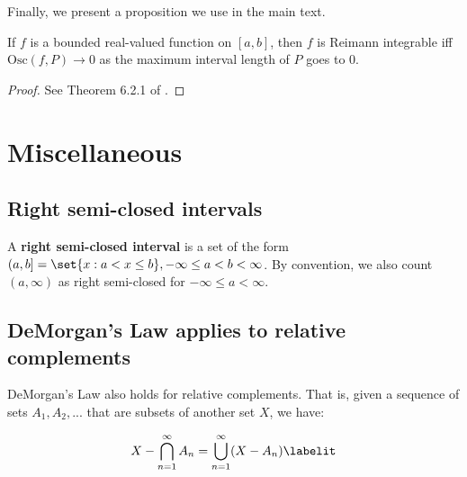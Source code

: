 \documentclass{article} %
\begin{document}
Finally, we present a proposition we use in the main text. 

\begin{proposition}
If $f$ is a bounded real-valued function on $[a,b]$, then $f$ is Reimann integrable iff $\text{Osc}(f,P) \to 0$ as the maximum interval length of $P$ goes to 0.
\label{prop:reimann_integrable_iff_oscillation_goes_to_zero_as_partition_gets_finer}
\end{proposition}

\begin{proof}
See Theorem 6.2.1 of \cite{strichartz2000way}.	
\end{proof}



\section{Miscellaneous}
\subsection{Right semi-closed intervals}
\begin{definition}
A \textbf{right semi-closed interval} is a set of the form $(a,b] = \set{x : a < x \leq b}, -\infty \leq a < b < \infty$.  By convention, we also count $(a,\infty)$ as right semi-closed for $-\infty \leq a < \infty$. 
\label{def:rsc_intervals}
\end{definition}

\subsection{DeMorgan's Law applies to relative complements} 

\begin{remark}
DeMorgan's Law also holds for relative complements.  That is, given a sequence of sets $A_1, A_2, ...$ that are subsets of another set $X$, we have:

\begin{align*}
X - \bigcap_{n=1}^\infty A_n = \bigcup_{n=1}^\infty (X - A_n)
\labelit \label{eqn:demorgan_for_relative_complements}	
\end{align*}

	
\end{remark}
\end{document}
